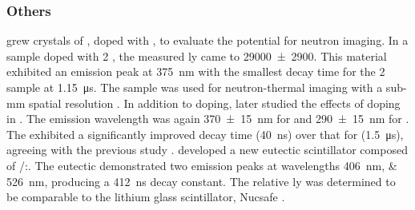 \documentclass[../../../../main.tex]{subfiles}%
\begin{document}
%
    \subsubsection{Others}%
    \label{sec:chapter-2:scintillator-detectors:ceramics:others}%
    \citeauthor*{Yanagida_2011} grew crystals of , doped with , to evaluate the potential for neutron imaging.
    In a sample doped with \SI{2}{\percentmole} , the measured \gls{ly} came to \SI[separate-uncertainty=false]{29000(2900)}{\lightyield}.
    This material exhibited an emission peak at \SI{375}{\nano\meter} with the smallest decay time for the \SI{2}{\percentmole} sample at \SI{1.15}{\micro\second}.
    The sample was used for \gls{neutron-thermal} imaging with a sub{\--}\si{\milli\meter} spatial resolution \cite{Yanagida_2011}.
    In addition to  doping, \citeauthor*{Yanagida_2014} later studied the effects of  doping in .
    The emission wavelength was again \SI{370(15)}{\nano\meter} for  and \SI{290(15)}{\nano\meter} for .
    The  exhibited a significantly improved decay time (\SI{40}{\nano\second}) over that for  (\SI{1.5}{\micro\second}), agreeing with the previous study \cite{Yanagida_2014}.
    \citeauthor*{Wu_2015} developed a new eutectic scintillator composed of /:.
    The eutectic demonstrated two emission peaks at wavelengths \SIlist{406; 526}{\nano\meter}, producing a \SI{412}{\nano\second} decay constant.
    The relative \gls{ly} was determined to be comparable to the lithium glass scintillator, Nucsafe \cite{Wu_2015}.
\end{document}
